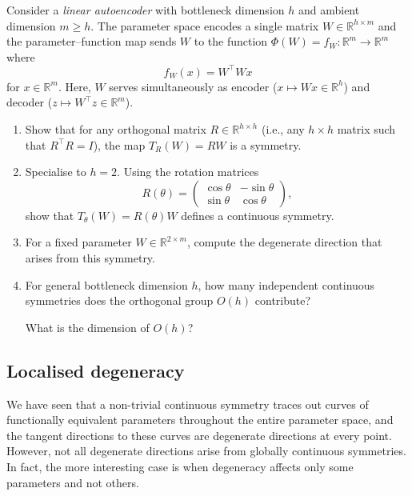 \documentclass[11pt]{article}
\newcommand{\R}{\mathbb{R}}
\begin{document}
\begin{exercise}
\label{ex:rotation-symmetry}
    Consider a \emph{linear autoencoder} with bottleneck dimension $h$ and ambient dimension $m \geq h$. The parameter space encodes a single matrix $W \in \R^{h \times m}$ and the parameter--function map sends $W$ to the function $\Phi(W) = f_W : \R^m \to \R^m$ where
    \begin{equation*}
        f_W(x) = W^\top W x
    \end{equation*}
    for $x \in \R^m$. Here, $W$ serves simultaneously as encoder ($x \mapsto Wx
    \in \R^h$) and decoder ($z \mapsto W^\top z \in \R^m$).
\begin{enumerate}
    \item
        Show that for any orthogonal matrix $R \in \R^{h \times h}$ (i.e., any
        $h \times h$ matrix such that $R^\top R = I$), the map $T_R(W) = RW$
        is a symmetry.
    \item
        Specialise to $h = 2$. Using the rotation matrices
        \begin{equation*}
            R(\theta) = \begin{pmatrix}
                \cos\theta & -\sin\theta
            \\  \sin\theta & \cos\theta
            \end{pmatrix},
        \end{equation*}
        show that $T_\theta(W) = R(\theta) W$ defines a continuous symmetry.
    \item
        For a fixed parameter $W \in \R^{2 \times m}$, compute the degenerate
        direction that arises from this symmetry.
    \item
        For general bottleneck dimension $h$, how many independent continuous
        symmetries does the orthogonal group $O(h)$ contribute?
        \begin{hint}
What is the dimension of $O(h)$?
        \end{hint}
\end{enumerate}
\end{exercise}

\subsection{Localised degeneracy}

We have seen that a non-trivial continuous symmetry traces out curves of
functionally equivalent parameters throughout the entire parameter space, and
the tangent directions to these curves are degenerate directions at every
point. However, not all degenerate directions arise from globally continuous
symmetries. In fact, the more interesting case is when degeneracy affects only
some parameters and not others.
\end{document}
